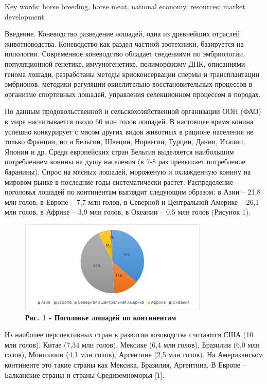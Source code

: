 Key words: horse breeding, horse meat, national economy, resources;
market development.
\begin{multicols}{2}

Введение. Коневодство разведение лошадей, одна из древнейших отраслей
животноводства. Коневодство как раздел частной зоотехники, базируется на
иппологии. Современное коневодство обладает сведениями по эмбриологии,
популяционной генетике, имууногенетике, полиморфизму ДНК, описаниями
генома лошади, разработаны методы криоконсервации спермы и
трансплантации эмбрионов, методики регуляции
окислительно-восстановительных процессов в организме спортивных лошадей,
управления селекционном процессом в породах.

По данным продовольственной и сельскохозяйственной организации ООН (ФАО)
в мире насчитывается около 60 млн голов лошадей. В настоящее время
конина успешно конкурирует с мясом других видов животных в рационе
населения не только Франции, но и Бельгии, Швеции, Норвегии, Турции,
Дании, Италии, Японии и др. Среди европейских стран Бельгия выделяется
наибольшим потреблением конины на душу населения (в 7-8 раз превышает
потребление баранины). Спрос на мясных лошадей, мороженую и охлажденную
конину на мировом рынке в последние годы систематически растет.
Распределение поголовья лошадей по континентам выглядит следующим
образом: в Азии -- 21,8 млн голов, в Европе -- 7,7 млн голов, в Северной
и Центральной Америке -- 26,1 млн голов, в Африке -- 3,9 млн голов, в
Океании -- 0,5 млн голов (Рисунок 1).
\end{multicols}

\begin{figure}[H]
	\centering
	\includegraphics[width=0.8\textwidth]{assets/307-1}
	\caption*{\bfseries Рис. 1 - Поголовье лошадей по континентам}
\end{figure}


Из наиболее перспективных стран в развитии козоводства считаются США (10
млн голов), Китае (7,34 млн голов), Мексике (6,4 млн голов), Бразилии
(6,0 млн голов), Монголоии (4,1 млн голов), Аргентине (2,5 млн голов).
На Американском континенте это такие страны как Мексика, Бразилия,
Аргентина. В Европе -- Балканские страны и страны Средиземноморья
{[}1{]}.

